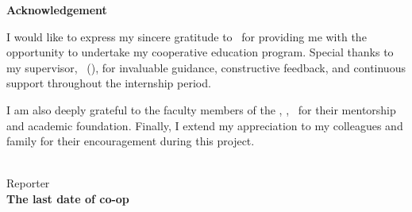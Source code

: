 \newpage
\renewcommand{\thepage}{(2)}

\begin{center}
  {\bfseries Acknowledgement \par}
\end{center}
\vspace{1em}

\noindent
I would like to express my sincere gratitude to \companyName\ for providing me with the opportunity to undertake my cooperative education program. Special thanks to my supervisor, \supervisorName\ (\supervisorPosition), for invaluable guidance, constructive feedback, and continuous support throughout the internship period.

I am also deeply grateful to the faculty members of the \departmentName, \facultyName, \universityName\ for their mentorship and academic foundation. Finally, I extend my appreciation to my colleagues and family for their encouragement during this project.

\vspace{3cm}

\begin{flushright}
  \begin{minipage}{0.5\textwidth}
    \centering
    \studentName \\[0.5em]
    Reporter \\[1.5em]
    \textbf{The last date of co-op} \\[0.3em]
    \coopEndDate
  \end{minipage}
\end{flushright}

\clearpage